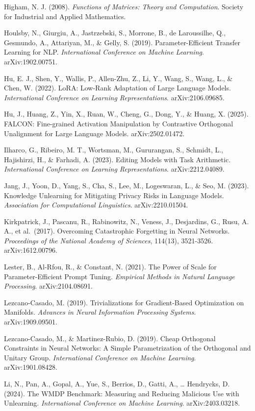 \documentclass[
]{article}
\begin{document}
Higham, N. J. (2008). \emph{Functions of Matrices: Theory and Computation}. Society for Industrial and Applied Mathematics.

Houlsby, N., Giurgiu, A., Jastrzebski, S., Morrone, B., de Laroussilhe, Q., Gesmundo, A., Attariyan, M., \& Gelly, S. (2019). Parameter-Efficient Transfer Learning for NLP. \emph{International Conference on Machine Learning}. arXiv:1902.00751.

Hu, E. J., Shen, Y., Wallis, P., Allen-Zhu, Z., Li, Y., Wang, S., Wang, L., \& Chen, W. (2022). LoRA: Low-Rank Adaptation of Large Language Models. \emph{International Conference on Learning Representations}. arXiv:2106.09685.

Hu, J., Huang, Z., Yin, X., Ruan, W., Cheng, G., Dong, Y., \& Huang, X. (2025). FALCON: Fine-grained Activation Manipulation by Contrastive Orthogonal Unalignment for Large Language Models. arXiv:2502.01472.

Ilharco, G., Ribeiro, M. T., Wortsman, M., Gururangan, S., Schmidt, L., Hajishirzi, H., \& Farhadi, A. (2023). Editing Models with Task Arithmetic. \emph{International Conference on Learning Representations}. arXiv:2212.04089.

Jang, J., Yoon, D., Yang, S., Cha, S., Lee, M., Logeswaran, L., \& Seo, M. (2023). Knowledge Unlearning for Mitigating Privacy Risks in Language Models. \emph{Association for Computational Linguistics}. arXiv:2210.01504.

Kirkpatrick, J., Pascanu, R., Rabinowitz, N., Veness, J., Desjardins, G., Rusu, A. A., et al.~(2017). Overcoming Catastrophic Forgetting in Neural Networks. \emph{Proceedings of the National Academy of Sciences}, 114(13), 3521-3526. arXiv:1612.00796.

Lester, B., Al-Rfou, R., \& Constant, N. (2021). The Power of Scale for Parameter-Efficient Prompt Tuning. \emph{Empirical Methods in Natural Language Processing}. arXiv:2104.08691.

Lezcano-Casado, M. (2019). Trivializations for Gradient-Based Optimization on Manifolds. \emph{Advances in Neural Information Processing Systems}. arXiv:1909.09501.

Lezcano-Casado, M., \& Martinez-Rubio, D. (2019). Cheap Orthogonal Constraints in Neural Networks: A Simple Parametrization of the Orthogonal and Unitary Group. \emph{International Conference on Machine Learning}. arXiv:1901.08428.

Li, N., Pan, A., Gopal, A., Yue, S., Berrios, D., Gatti, A., \ldots{} Hendrycks, D. (2024). The WMDP Benchmark: Measuring and Reducing Malicious Use with Unlearning. \emph{International Conference on Machine Learning}. arXiv:2403.03218.
\end{document}
